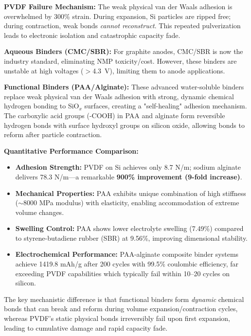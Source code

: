 \documentclass[12pt,a4paper]{article}
\begin{document}
\noindent\textbf{PVDF Failure Mechanism:} The weak physical van der Waals adhesion is overwhelmed by 300\% strain. During expansion, Si particles are ripped free; during contraction, weak bonds \textit{cannot reconstruct}. This repeated pulverization leads to electronic isolation and catastrophic capacity fade.\citep{ref1}

\noindent\textbf{Aqueous Binders (CMC/SBR):} For graphite anodes, CMC/SBR is now the industry standard, eliminating NMP toxicity/cost. However, these binders are unstable at high voltages ($>$4.3~V), limiting them to anode applications.\citep{ref1}

\noindent\textbf{Functional Binders (PAA/Alginate):} These advanced water-soluble binders replace weak physical van der Waals adhesion with strong, dynamic chemical hydrogen bonding to SiO$_x$ surfaces, creating a "self-healing" adhesion mechanism. The carboxylic acid groups (-COOH) in PAA and alginate form reversible hydrogen bonds with surface hydroxyl groups on silicon oxide, allowing bonds to reform after particle contraction.\citep{ref18,ref44,ref45}

\textbf{Quantitative Performance Comparison:}
\begin{itemize}
  \item \textbf{Adhesion Strength:} PVDF on Si achieves only 8.7 N/m; sodium alginate delivers 78.3 N/m—a remarkable \textbf{900\% improvement (9-fold increase)}.
  \item \textbf{Mechanical Properties:} PAA exhibits unique combination of high stiffness ($\sim$8000 MPa modulus) with elasticity, enabling accommodation of extreme volume changes.
  \item \textbf{Swelling Control:} PAA shows lower electrolyte swelling (7.49\%) compared to styrene-butadiene rubber (SBR) at 9.56\%, improving dimensional stability.\citep{ref49}
  \item \textbf{Electrochemical Performance:} PAA-alginate composite binder systems achieve 1419.8 mAh/g after 200 cycles with 99.5\% coulombic efficiency, far exceeding PVDF capabilities which typically fail within 10--20 cycles on silicon.
\end{itemize}

The key mechanistic difference is that functional binders form \textit{dynamic} chemical bonds that can break and reform during volume expansion/contraction cycles, whereas PVDF's static physical bonds irreversibly fail upon first expansion, leading to cumulative damage and rapid capacity fade.
\end{document}
